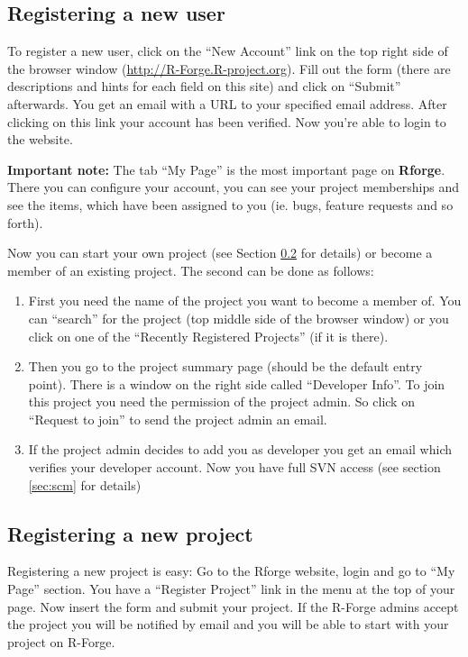\documentclass[a4paper]{article}
\begin{document}
\subsection{Registering a  new user}

To register a new user, click on the ``New Account'' link on the top
right side of the browser window (\url{http://R-Forge.R-project.org}).
Fill out the form (there are descriptions and hints for each field on
this site) and click on ``Submit'' afterwards. You get an email with
a URL to your specified email address. After clicking on this link
your account has been verified. Now you're able to login to the
website.
\newline

\textbf{Important note:} The tab ``My Page'' is the most important
page on \textbf{Rforge}. There you can configure your account, you can see your
project memberships and see the items, which have been assigned to you
(ie. bugs, feature requests and so forth).
\newline

Now you can start your own project (see Section \ref{sec:newproject}
for details) or become a member of an existing project. The second
can be done as follows:

\begin{enumerate}
\item First you need the name of the project you want to become a
  member of. You can ``search'' for the project (top middle side of the
  browser window) or you click on one of the ``Recently Registered
  Projects'' (if it is there).
\item Then you go to the project summary page (should be the default
  entry point). There is a window on the right side called
  ``Developer Info''. To join this project you need the permission of
  the project admin. So click on ``Request to join'' to send the
  project admin an email.
\item If the project admin decides to add you as developer you get an
  email which verifies your developer account. Now you have full SVN
  access (see section \ref{sec:scm} for details)
\end{enumerate}

\subsection{Registering a new project}
\label{sec:newproject}

Registering a new project is easy: Go to the Rforge website, login and
go to ``My Page'' section. You have a ``Register Project'' link in the
menu at the top of your page. Now insert the form and submit your
project. If the R-Forge admins accept the project you will be notified
by email and you will be able to start with your project on R-Forge.
\end{document}
